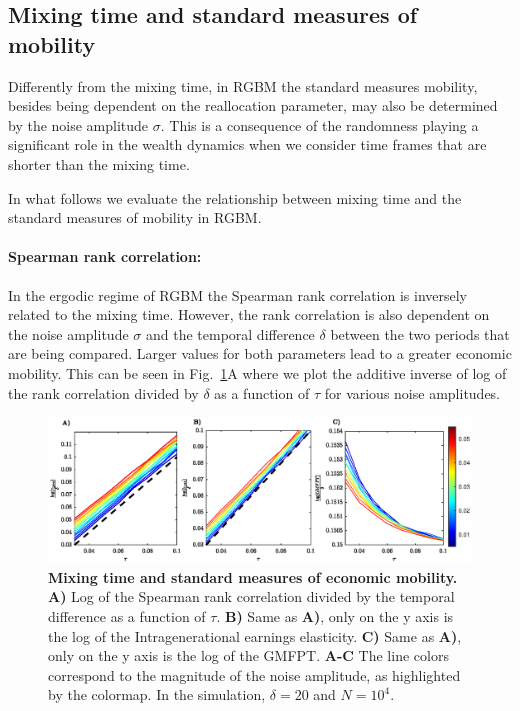 \documentclass[11pt]{article}
\numberwithin{equation}{section}
\begin{document}
\subsection{Mixing time and standard measures of mobility}\label{sec:measures}

Differently from the mixing time, in RGBM the standard measures mobility, besides being dependent on the reallocation parameter, may also be determined by the noise amplitude $\sigma$. This is a consequence of the randomness playing a significant role in the wealth dynamics when we consider time frames that are shorter than the mixing time. 

In what follows we evaluate the relationship between mixing time and the standard measures of mobility in RGBM.

\paragraph{Spearman rank correlation:} In the ergodic regime of RGBM the Spearman rank correlation is inversely related to the mixing time. However, the rank correlation is also dependent on the noise amplitude $\sigma$ and the temporal difference $\delta$ between the two periods that are being compared. Larger values for both parameters lead to a greater economic mobility. This can be seen in  Fig.~\ref{fig:rgbm-standard-measures}A where we plot the additive inverse of log of the rank correlation divided by $\delta$ as a function of $\tau$ for various noise amplitudes.


\begin{figure}[t!]
\includegraphics[width=\linewidth]{figs/fig_mixing_time_vs_standard_measures.eps}
\caption{\textbf{Mixing time and standard measures of economic mobility.} \textbf{A)} Log of the Spearman rank correlation divided by the temporal difference as a function of $\tau$. \textbf{B)} Same as \textbf{A)}, only on the y axis is the log of the Intragenerational earnings elasticity. \textbf{C)} Same as \textbf{A)}, only on the y axis is the log of the GMFPT. \textbf{A-C} The line colors correspond to the magnitude of the noise amplitude, as highlighted by the colormap. In the simulation, $\delta = 20$ and $N = 10^4$.\label{fig:rgbm-standard-measures}}
\end{figure}
\end{document}
